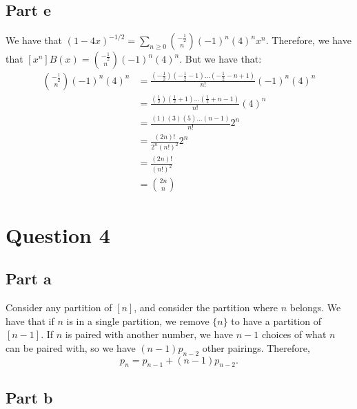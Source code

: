 \documentclass[]{article}
\begin{document}
\subsection{Part e}
We have that $(1-4x)^{-1/2} =\sum_{n \geq 0} \binom{-\frac{1}{2}}{n}(-1)^n (4)^n x^n$. Therefore, we have that $[x^n] B(x) = \binom{-\frac{1}{2}}{n}(-1)^n (4)^n$. But we have that:
\begin{align*}
	\binom{-\frac{1}{2}}{n}(-1)^n (4)^n &= \frac{(-\frac{1}{2})(-\frac{1}{2} - 1) ... (-\frac{1}{2} - n + 1)}{n!} (-1)^n (4)^n\\
	&= \frac{(\frac{1}{2})(\frac{1}{2} + 1) ... (\frac{1}{2} + n - 1)}{n!}(4)^n\\
	&= \frac{(1)(3)(5) ... (n-1)}{n!} 2^n\\
	&= \frac{(2n)!}{2^n (n!)^2}2^n\\
	&= \frac{(2n)!}{(n!)^2}\\
	&= \binom{2n}{n}
\end{align*}
\section{Question 4}
\subsection{Part a}
Consider any partition of $[n]$, and consider the partition where $n$ belongs. We have that if $n$ is in a single partition, we remove $\lbrace n \rbrace$ to have a partition of $[n-1]$. If $n$ is paired with another number, we have $n-1$ choices of what $n$ can be paired with, so we have $(n-1) p_{n-2}$ other pairings. Therefore,
\begin{equation}
	p_n = p_{n-1} + (n-1) p_{n-2}.
\end{equation}

\subsection{Part b}
\end{document}
